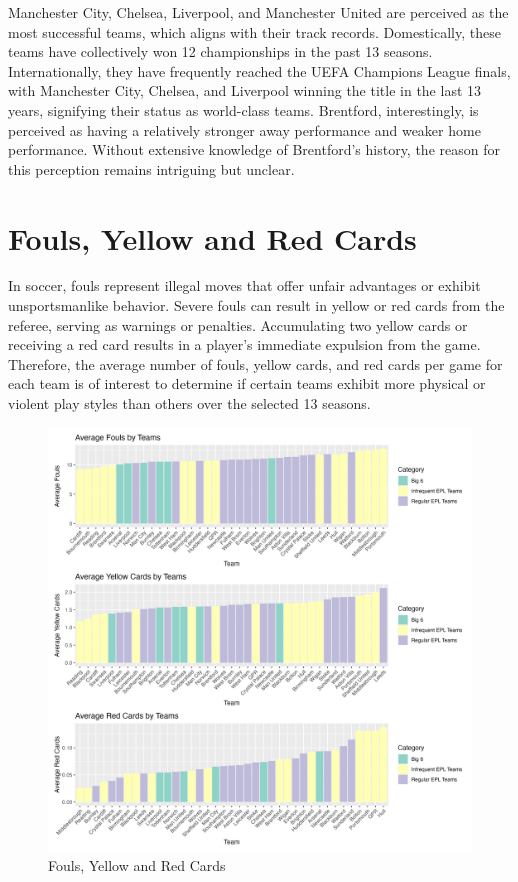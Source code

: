 \documentclass{article}
\begin{document}
Manchester City, Chelsea, Liverpool, and Manchester United are perceived as the most successful teams, which aligns with their track records. Domestically, these teams have collectively won 12 championships in the past 13 seasons. Internationally, they have frequently reached the UEFA Champions League finals, with Manchester City, Chelsea, and Liverpool winning the title in the last 13 years, signifying their status as world-class teams.
Brentford, interestingly, is perceived as having a relatively stronger away performance and weaker home performance. Without extensive knowledge of Brentford's history, the reason for this perception remains intriguing but unclear.

\section{Fouls, Yellow and Red Cards}
In soccer, fouls represent illegal moves that offer unfair advantages or exhibit unsportsmanlike behavior. Severe fouls can result in yellow or red cards from the referee, serving as warnings or penalties. Accumulating two yellow cards or receiving a red card results in a player's immediate expulsion from the game. Therefore, the average number of fouls, yellow cards, and red cards per game for each team is of interest to determine if certain teams exhibit more physical or violent play styles than others over the selected 13 seasons.

\begin{figure}[h!]
\centering
\includegraphics[width=\textwidth]{Team_Fouls.png}
\caption{\label{fig:fouls}Fouls, Yellow and Red Cards}
\end{figure}
\end{document}
